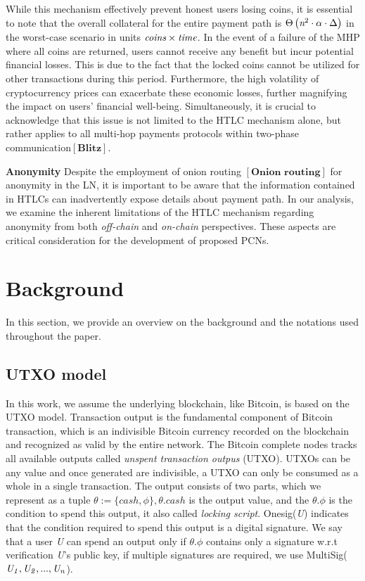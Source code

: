 \documentclass[conference]{IEEEtran}
\begin{document}
While this mechanism effectively prevent honest users losing coins, it is essential to note that the overall collateral for the entire payment path 
is $\Theta \left ( \emph{n}^{2}\cdot \alpha\cdot  \Delta  \right )$ in the worst-case scenario in units $ \emph{coins}\times \emph{time}$. 
In the event of a failure of the MHP where all coins are returned, users cannot receive any benefit but incur potential financial
losses. This is due to the fact that the locked coins cannot be utilized for other transactions during this period. Furthermore, the high 
volatility of cryptocurrency prices can exacerbate these economic losses, further magnifying the impact on users' financial well-being. 
Simultaneously, it is crucial to acknowledge that this issue is not limited to the HTLC mechanism alone, but rather
applies to all multi-hop payments protocols within two-phase communication$\left [ \textbf{Blitz} \right ]$. 

\textbf{Anonymity} Despite the employment of onion routing $\left [ \textbf{Onion routing} \right ]$ for anonymity in the LN, it is important
to be aware that the information contained in HTLCs can inadvertently expose details about payment path. In our analysis,
we examine the inherent limitations of the HTLC mechanism regarding anonymity from both \textit{off-chain} and \textit{on-chain}
perspectives. These aspects are critical consideration for the development of proposed PCNs.



\section{Background}
In this section, we provide an overview on the background and the
notations used throughout the paper.
\subsection{UTXO model}

In this work, we assume the underlying blockchain, like Bitcoin, is based on the UTXO model. Transaction output is the fundamental 
component of Bitcoin transaction, which is an indivisible Bitcoin currency recorded on the blockchain and recognized as valid by 
the entire network. The Bitcoin complete nodes tracks all available outputs called \emph{unspent transaction outpus} (UTXO). 
UTXOs can be any value and once generated are indivisible, a UTXO can only be consumed as a whole in a single transaction. 
The output consists of two parts, which we represent as a tuple $\theta :=\{cash,\phi\}, \theta.cash$ is the output value,
 and the $\theta.\phi$ is the condition to spend this output, it also called \emph{locking script}. Onesig(\emph{U}) indicates 
 that the condition required to spend this output is a digital signature. We say that a user \emph{U} can spend an output only if
 $\theta.\phi$ contains only a signature w.r.t verification  \emph{U}'s public key, if multiple signatures are required, we use 
 MultiSig($\it U_1,U_2,...,U_n$).
\end{document}
